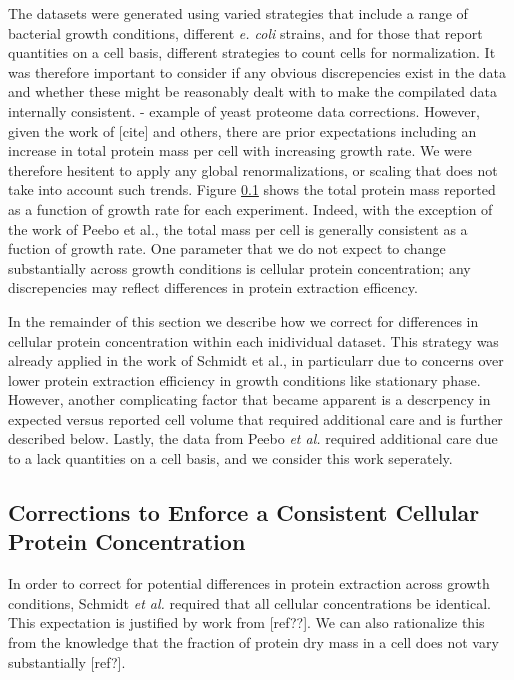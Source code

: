\documentclass[11pt]{article}
\begin{document}
The datasets were generated using varied strategies that include a range of
bacterial growth conditions,  different {\it e. coli} strains, and for those
that report quantities on a cell basis, different strategies to count cells for
normalization. It was therefore important to consider if any obvious
discrepencies exist in the data and whether these might be reasonably dealt with
to make the compilated data internally consistent. - example of yeast proteome
data corrections. However, given the work of [cite] and others, there are prior
expectations including an increase in total protein mass per cell with
increasing growth rate. We were therefore hesitent to apply any global
renormalizations, or scaling that does not take into account such trends. Figure
\ref{} shows the total protein  mass reported as a function of growth rate for
each experiment. Indeed, with the exception of the work of Peebo et al., the
total mass per cell is generally consistent as a fuction of growth rate. One
parameter that we do not expect to change substantially across growth conditions
is cellular protein concentration; any discrepencies may reflect differences in
protein extraction efficency.

In the remainder of this section we describe how we correct for differences in
cellular protein concentration within each inidividual dataset. This  strategy
was already applied in the work of Schmidt et al., in particularr due to
concerns  over lower protein extraction efficiency in growth conditions like
stationary phase.  However, another complicating factor that became apparent is
a descrpency in expected versus reported cell volume that required additional
care and is further described below. Lastly, the  data from Peebo {\it et al.}
required additional care due to a lack quantities on a cell basis, and we
consider this work seperately.


\subsection{Corrections to Enforce a Consistent Cellular Protein Concentration}



In order to correct for potential differences in protein extraction across
growth conditions, Schmidt {\it et al.} required that all cellular concentrations
be identical. This expectation is justified by work from [ref??]. We can also rationalize
this from the knowledge that the fraction  of protein dry mass in a cell does not
vary substantially [ref?].
\end{document}

